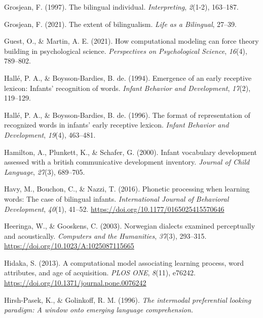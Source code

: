 \documentclass[
  12pt,
  b5paperpaper,
  twoside]{scrreprt}
\newlength{\cslhangindent}
\newlength{\cslentryspacingunit} %
\newenvironment{CSLReferences}[2] %
 {%
  \setlength{\parindent}{0pt}
  \ifodd #1
  \let\oldpar\par
  \def\par{\hangindent=\cslhangindent\oldpar}
  \fi
  \setlength{\parskip}{#2\cslentryspacingunit}
 }%
 {}
\begin{document}
\begin{CSLReferences}{1}{0}
\leavevmode{}%
Grosjean, F. (1997). The bilingual individual. \emph{Interpreting},
\emph{2}(1-2), 163--187.

\leavevmode{}%
Grosjean, F. (2021). The extent of bilingualism. \emph{Life as a
Bilingual}, 27--39.

\leavevmode{}%
Guest, O., \& Martin, A. E. (2021). How computational modeling can force
theory building in psychological science. \emph{Perspectives on
Psychological Science}, \emph{16}(4), 789--802.

\leavevmode{}%
Hallé, P. A., \& Boysson-Bardies, B. de. (1994). Emergence of an early
receptive lexicon: Infants' recognition of words. \emph{Infant Behavior
and Development}, \emph{17}(2), 119--129.

\leavevmode{}%
Hallé, P. A., \& Boysson-Bardies, B. de. (1996). The format of
representation of recognized words in infants' early receptive lexicon.
\emph{Infant Behavior and Development}, \emph{19}(4), 463--481.

\leavevmode{}%
Hamilton, A., Plunkett, K., \& Schafer, G. (2000). Infant vocabulary
development assessed with a british communicative development inventory.
\emph{Journal of Child Language}, \emph{27}(3), 689--705.

\leavevmode{}%
Havy, M., Bouchon, C., \& Nazzi, T. (2016). Phonetic processing when
learning words: The case of bilingual infants. \emph{International
Journal of Behavioral Development}, \emph{40}(1), 41--52.
\url{https://doi.org/10.1177/0165025415570646}

\leavevmode{}%
Heeringa, W., \& Gooskens, C. (2003). Norwegian dialects examined
perceptually and acoustically. \emph{Computers and the Humanities},
\emph{37}(3), 293--315. \url{https://doi.org/10.1023/A:1025087115665}

\leavevmode{}%
Hidaka, S. (2013). A computational model associating learning process,
word attributes, and age of acquisition. \emph{{PLOS} {ONE}},
\emph{8}(11), e76242. \url{https://doi.org/10.1371/journal.pone.0076242}

\leavevmode{}%
Hirsh-Pasek, K., \& Golinkoff, R. M. (1996). \emph{The intermodal
preferential looking paradigm: A window onto emerging language
comprehension.}


\end{CSLReferences}
\end{document}
